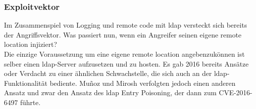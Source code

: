 \subsubsection{Exploitvektor}
Im Zusammenspiel von Logging und remote code mit ldap versteckt sich bereits der Angriffsvektor. Was passiert nun, wenn ein Angreifer
seinen eigene remote location injiziert?\\
Die einzige Voraussetzung um eine eigene remote location angebenzukönnen ist selber einen \gls{ldap}-Server aufzusetzen und zu hosten. Es gab 2016 bereits Ansätze
oder Verdacht zu einer ähnlichen Schwachstelle, die sich auch an der \gls{ldap}-Funktionalität bediente. Muñoz und Mirosh verfolgten jedoch einen anderen Ansatz und zwar den Ansatz des \gls{ldap} Entry Poisoning,
der dann zum CVE-2016-6497 führte.
